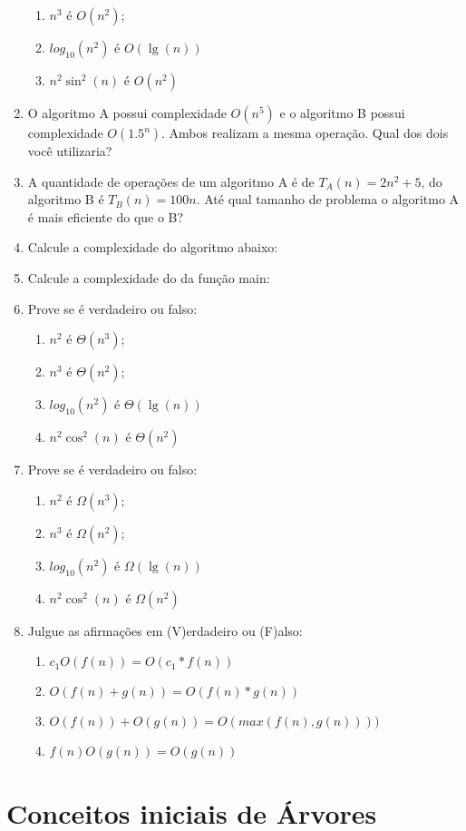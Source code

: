 \documentclass[12pt]{article}
\begin{document}
\begin{enumerate}[resume,label=\textbf{Q\arabic*}]
\begin{enumerate}
              \item $n^3$ é $O(n^2)$;
              \item $log_{10}(n^2)$ é $O(\lg(n))$
              \item $n^2\sin^2(n)$ é $O(n^2)$
          \end{enumerate}
    \item O algoritmo A possui complexidade $O(n^5)$ e o algoritmo B possui complexidade $O(1.5^n)$. Ambos realizam a mesma operação. Qual dos dois você utilizaria?
    \item A quantidade de operações de um algoritmo A é de $T_A(n) = 2n^2 + 5$, do algoritmo B é $T_B(n) = 100n$. Até qual tamanho de problema o algoritmo A é mais eficiente do que o B?
    \item Calcule a complexidade do algoritmo abaixo:
    \item Calcule a complexidade do da função main:
    \item Prove se é verdadeiro ou falso:
          \begin{enumerate}
              \item $n^2$ é $\Theta(n^3)$;
              \item $n^3$ é $\Theta(n^2)$;
              \item $log_{10}(n^2)$ é $\Theta(\lg(n))$
              \item $n^2\cos^2(n)$ é $\Theta(n^2)$
          \end{enumerate}
    \item Prove se é verdadeiro ou falso:
          \begin{enumerate}
              \item $n^2$ é $\Omega(n^3)$;
              \item $n^3$ é $\Omega(n^2)$;
              \item $log_{10}(n^2)$ é $\Omega(\lg(n))$
              \item $n^2\cos^2(n)$ é $\Omega(n^2)$
          \end{enumerate}
          \item Julgue as afirmações em (V)erdadeiro ou (F)also:
          \begin{enumerate}
            \item $c_1O(f(n)) = O(c_1*f(n))$
            \item $O(f(n) + g(n)) = O(f(n)*g(n))$
            \item $O(f(n)) + O(g(n)) = O(max(f(n),g(n))))$
            \item $f(n)O(g(n)) = O(g(n))$%
          \end{enumerate}
\end{enumerate}
\section*{Conceitos iniciais de Árvores}
\end{document}
